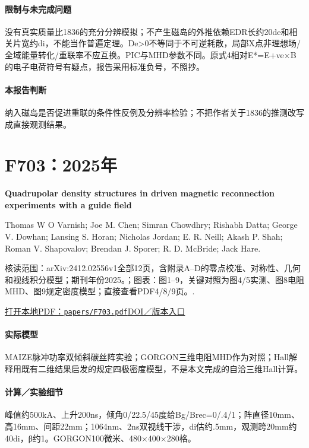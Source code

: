 \paragraph{限制与未完成问题}没有真实质量比1836的充分分辨模拟；不产生磁岛的外推依赖EDR长约20de和相关片宽约di，不能当作普遍定理。De>0不等同于不可逆耗散，局部X点非理想场/全域能量转化/重联率不应互换。PIC与MHD参数不同。原式4相对E*=E+ve×B的电子电荷符号有疑点，报告采用标准负号，不照抄。

\paragraph{本报告判断}纳入磁岛是否促进重联的条件性反例及分辨率检验；不把作者关于1836的推测改写成直接观测结果。

\section{F703：2025年}\label{paper:F703}

\textbf{Quadrupolar density structures in driven magnetic reconnection experiments with a guide field}\citep{F703}\

Thomas W O Varnish;  Joe M. Chen;  Simran Chowdhry;  Rishabh Datta;  George V. Dowhan;  Lansing S. Horan;  Nicholas Jordan;  E. R. Neill;  Akash P. Shah;  Roman V. Shapovalov;  Brendan J. Sporer;  R. D. McBride;  Jack Hare.

\textsf{核读范围：}arXiv:2412.02556v1全部12页，含附录A–D的零点校准、对称性、几何和视线积分模型；期刊年份2025。；\textsf{图表：}图1–9，关键对照为图4/5实测、图8电阻MHD、图9规定密度模型；直接查看PDF4/8/9页。.

\href{run:papers/F703.pdf}{打开本地PDF：\texttt{papers/F703.pdf}}\quad\href{https://doi.org/10.1063/5.0251581}{DOI／版本入口}

\paragraph{实际模型}MAIZE脉冲功率双倾斜碳丝阵实验；GORGON三维电阻MHD作为对照；Hall解释用既有二维结果启发的规定四极密度模型，不是本文完成的自洽三维Hall计算。

\paragraph{计算／实验细节}峰值约500kA、上升200ns，倾角0/22.5/45度给Bg/Brec=0/.4/1；阵直径10mm、高16mm、间距22mm；1064nm、2ns双视线干涉，di估约.5mm，观测跨20mm约40di，β约1。GORGON100微米、480×400×280格。

